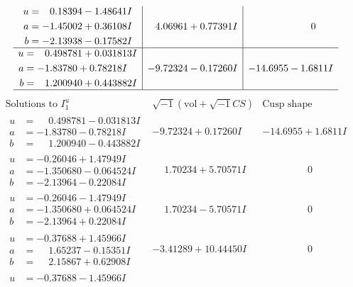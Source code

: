 \documentclass[1p]{elsarticle_modified}
\theoremstyle{definition}
\newcommand{\I}{\sqrt{-1}}
\begin{document}
$$\begin{array}{c|c|c}
\begin{aligned}
u &= \phantom{-}0.18394 - 1.48641 I \\
a &= -1.45002 + 0.36108 I \\
b &= -2.13938 - 0.17582 I\end{aligned}
 & \phantom{-}4.06961 + 0.77391 I & \phantom{-0.000000 } 0 \\ \hline\begin{aligned}
u &= \phantom{-}0.498781 + 0.031813 I \\
a &= -1.83780 + 0.78218 I \\
b &= \phantom{-}1.200940 + 0.443882 I\end{aligned}
 & -9.72324 - 0.17260 I & -14.6955 - 1.6811 I\\
 \hline 
 \end{array}$$\newpage$$\begin{array}{c|c|c}  
\text{Solutions to }I^u_{1}& \I (\text{vol} + \sqrt{-1}CS) & \text{Cusp shape}\\
 \hline 
\begin{aligned}
u &= \phantom{-}0.498781 - 0.031813 I \\
a &= -1.83780 - 0.78218 I \\
b &= \phantom{-}1.200940 - 0.443882 I\end{aligned}
 & -9.72324 + 0.17260 I & -14.6955 + 1.6811 I \\ \hline\begin{aligned}
u &= -0.26046 + 1.47949 I \\
a &= -1.350680 - 0.064524 I \\
b &= -2.13964 - 0.22084 I\end{aligned}
 & \phantom{-}1.70234 + 5.70571 I & \phantom{-0.000000 } 0 \\ \hline\begin{aligned}
u &= -0.26046 - 1.47949 I \\
a &= -1.350680 + 0.064524 I \\
b &= -2.13964 + 0.22084 I\end{aligned}
 & \phantom{-}1.70234 - 5.70571 I & \phantom{-0.000000 } 0 \\ \hline\begin{aligned}
u &= -0.37688 + 1.45966 I \\
a &= \phantom{-}1.65237 - 0.15351 I \\
b &= \phantom{-}2.15867 + 0.62908 I\end{aligned}
 & -3.41289 + 10.44450 I & \phantom{-0.000000 } 0 \\ \hline\begin{aligned}
u &= -0.37688 - 1.45966 I \\

\end{aligned}
\end{array}$$
\end{document}
